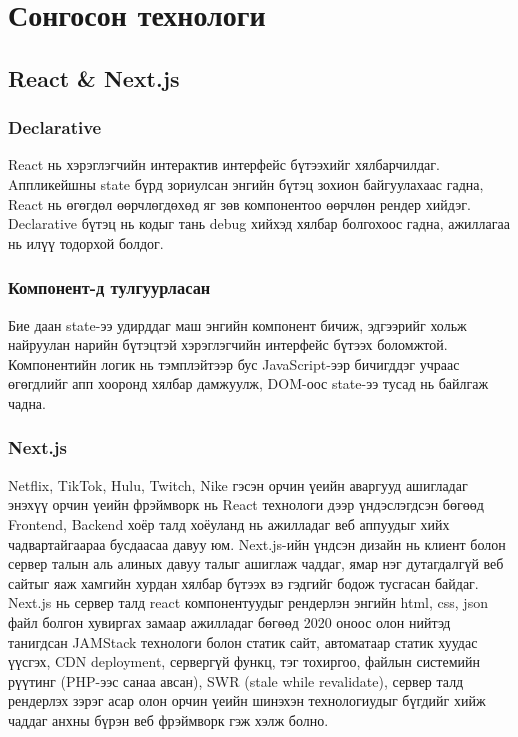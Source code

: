 \section{Сонгосон технологи}
\subsection{React \& Next.js}
\subsubsection{Declarative}
React нь хэрэглэгчийн интерактив интерфейс бүтээхийг хялбарчилдаг. Aппликейшны state бүрд зориулсан энгийн бүтэц зохион байгуулахаас гадна, React нь өгөгдөл өөрчлөгдөхөд яг зөв компонентоо өөрчлөн рендер хийдэг. Declarative бүтэц нь кодыг тань debug хийхэд хялбар болгохоос гадна, ажиллагаа нь илүү тодорхой болдог.

\subsubsection{Компонент-д тулгуурласан}
Бие даан state-ээ удирддаг маш энгийн компонент бичиж, эдгээрийг хольж найруулан нарийн бүтэцтэй хэрэглэгчийн интерфейс бүтээх боломжтой. Компонентийн логик нь тэмплэйтээр бус JavaScript-ээр бичигддэг учраас өгөгдлийг апп хооронд хялбар дамжуулж, DOM-оос state-ээ тусад нь байлгаж чадна.

\subsubsection{Next.js}
Netflix, TikTok, Hulu, Twitch, Nike гэсэн орчин үеийн аваргууд ашигладаг энэхүү орчин үеийн фрэймворк нь React технологи дээр үндэслэгдсэн бөгөөд Frontend, Backend хоёр талд хоёуланд нь ажилладаг веб аппуудыг хийх чадвартайгаараа бусдаасаа давуу юм. Next.js-ийн үндсэн дизайн нь клиент болон сервер талын аль алиных давуу талыг ашиглаж чаддаг, ямар нэг дутагдалгүй веб сайтыг яаж хамгийн хурдан хялбар бүтээх вэ гэдгийг бодож тусгасан байдаг. Next.js нь сервер талд react компонентуудыг рендерлэн энгийн html, css, json файл болгон хувиргах замаар ажилладаг бөгөөд 2020 оноос олон нийтэд танигдсан JAMStack технологи болон статик сайт, автоматаар статик хуудас үүсгэх, CDN deployment, сервергүй функц, тэг тохиргоо, файлын системийн рүүтинг (PHP-ээс санаа авсан), SWR (stale while revalidate), сервер талд рендерлэх зэрэг асар олон орчин үеийн шинэхэн технологиудыг бүгдийг хийж чаддаг анхны бүрэн веб фрэймворк гэж хэлж болно.

